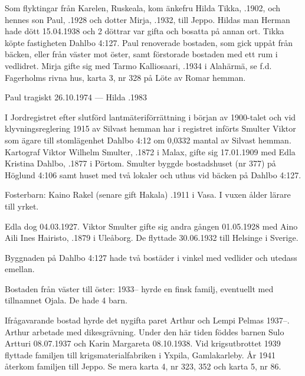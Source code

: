 Som flyktingar från Karelen, Ruskeala, kom änkefru Hilda Tikka, .1902, och hennes son Paul, .1928 och dotter Mirja,	.1932, till Jeppo. Hildas man Herman hade dött 15.04.1938 och 2 döttrar var gifta och bosatta på annan ort. Tikka köpte fastigheten Dahlbo 4:127. Paul renoverade bostaden, som gick uppåt från bäcken, eller från väster mot öster, samt förstorade bostaden med ett rum i vedlidret. Mirja gifte sig med Tarmo Kalliosaari, .1934 i Alahärmä, se f.d. Fagerholms rivna hus, karta 3, nr 328 på Löte av Romar hemman.

Paul \textdied tragiskt 26.10.1974 --- Hilda .1983


I Jordregistret efter slutförd lantmäteriförrättning i början av 1900-talet	och vid klyvningsreglering 1915 av Silvast hemman har i registret införts	Smulter Viktor som ägare till stomlägenhet Dahlbo 4:12 om 0,0332 mantal av Silvast hemman. Kartograf Viktor Wilhelm Smulter, .1872 i Malax, gifte sig 17.01.1909 med Edla Kristina Dahlbo, .1877 i 	Pörtom. Smulter byggde bostadshuset (nr 377) på Höglund 4:106 samt huset med två lokaler och uthus vid bäcken på Dahlbo 4:127.

Fosterbarn: Kaino Rakel (senare gift Hakala) .1911 i Vasa. I vuxen ålder lärare till yrket.

Edla dog 04.03.1927. Viktor Smulter gifte sig andra gången 01.05.1928 med Aino Aili Ines Hairisto, .1879 i Uleåborg. De flyttade 30.06.1932 till Helsinge i Sverige.


Byggnaden på Dahlbo 4:127 hade två bostäder i vinkel med vedlider och	utedass emellan.

Bostaden från väster till öster:
1933-- hyrde en finsk familj, eventuellt med tillnamnet Ojala. De hade 4 barn.

Ifrågavarande bostad hyrde det nygifta paret Arthur och Lempi	Pelmas 1937--. Arthur arbetade med dikesgrävning. Under den	här tiden föddes barnen Sulo Artturi 08.07.1937 och Karin	Margareta	08.10.1938. Vid krigsutbrottet 1939 flyttade familjen till	krigsmaterialfabriken i Yxpila, Gamlakarleby. År 1941 återkom familjen till Jeppo. Se mera karta 4, nr 323, 352 och karta 5, nr 86.

